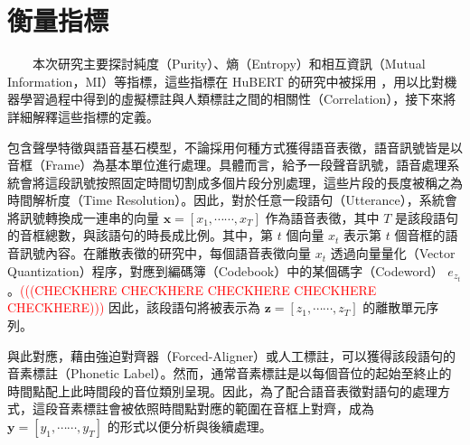 \section{衡量指標}          %

　　本次研究主要探討純度（Purity）、熵（Entropy）和相互資訊（Mutual Information，MI）等指標，這些指標在 HuBERT 的研究中被採用 \cite{hsu_hubert_2021, hsu_hubert_2021-2}，用以比對機器學習過程中得到的虛擬標註與人類標註之間的相關性（Correlation），接下來將詳細解釋這些指標的定義。

        包含聲學特徵與語音基石模型，不論採用何種方式獲得語音表徵，語音訊號皆是以音框（Frame）為基本單位進行處理。具體而言，給予一段聲音訊號，語音處理系統會將這段訊號按照固定時間切割成多個片段分別處理，這些片段的長度被稱之為時間解析度（Time Resolution）。因此，對於任意一段語句（Utterance），系統會將訊號轉換成一連串的向量 $\boldsymbol{x} = [x_1, \cdots\cdots, x_T]$ 作為語音表徵，其中 $T$ 是該段語句的音框總數，與該語句的時長成比例。其中，第 $t$ 個向量 \(x_t\) 表示第 $t$ 個音框的語音訊號內容。在離散表徵的研究中，每個語音表徵向量 $x_t$ 透過向量量化（Vector Quantization）程序，對應到編碼簿（Codebook）中的某個碼字（Codeword） $e_{z_t}$。\textcolor{red}{(((CHECKHERE CHECKHERE CHECKHERE CHECKHERE CHECKHERE)))  }因此，該段語句將被表示為 $\boldsymbol{z} = [z_1, \cdots\cdots, z_T]$ 的離散單元序列。

        與此對應，藉由強迫對齊器（Forced-Aligner）或人工標註，可以獲得該段語句的音素標註（Phonetic Label）。然而，通常音素標註是以每個音位的起始至終止的時間點配上此時間段的音位類別呈現。因此，為了配合語音表徵對語句的處理方式，這段音素標註會被依照時間點對應的範圍在音框上對齊，成為 $\boldsymbol{y} = [y_1, \cdots\cdots, y_T]$ 的形式以便分析與後續處理。

